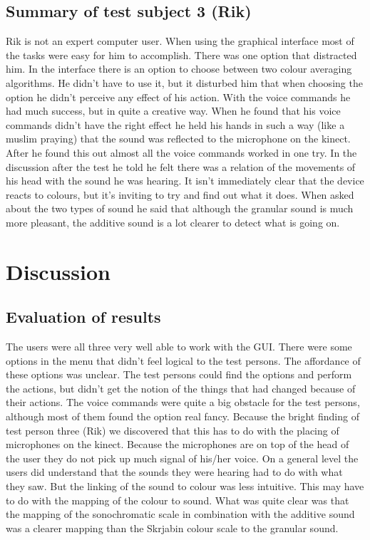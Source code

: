 \documentclass[11pt]{article}
\begin{document}
\subsection{Summary of test subject 3 (Rik)}
Rik is not an expert computer user. When using the graphical interface most of the tasks were easy for him to accomplish. There was one option that distracted him. In the interface there is an option to choose between two colour averaging algorithms. He didn't have to use it, but it disturbed him that when choosing the option he didn't perceive any effect of his action. With the voice commands he had much success, but in quite a creative way. When he found that his voice commands didn't have the right effect he held his hands in such a way (like a muslim praying) that the sound was reflected to the microphone on the kinect. After he found this out almost all the voice commands worked in one try.
\newline
In the discussion after the test he told he felt there was a relation of the movements of his head with the sound he was hearing. It isn't immediately clear that the device reacts to colours, but it's inviting to try and find out what it does. When asked about the two types of sound he said that although the granular sound is much more pleasant, the additive sound is a lot clearer to detect what is going on.

\section{Discussion}
\subsection{Evaluation of results}
The users were all three very well able to work with the GUI. There were some options in the menu that didn't feel logical to the test persons. The affordance of these options was unclear. The test persons could find the options and perform the actions, but didn't get the notion of the things that had changed because of their actions. 
\newline
The voice commands were quite a big obstacle for the test persons, although most of them found the option real fancy. Because the bright finding of test person three (Rik) we discovered that this has to do with the placing of microphones on the kinect. Because the microphones are on top of the head of the user they do not pick up much signal of his/her voice.
\newline
On a general level the users did understand that the sounds they were hearing had to do with what they saw. But the linking of the sound to colour was less intuitive. This may have to do with the mapping of the colour to sound. What was quite clear was that the mapping of the sonochromatic scale in combination with the additive sound was a clearer mapping than the Skrjabin colour scale to the granular sound. 
\end{document}
